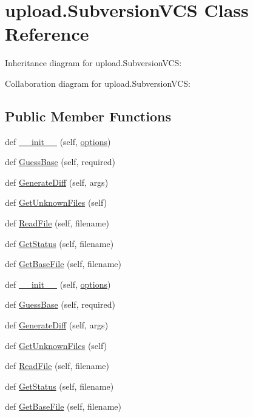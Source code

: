 \hypertarget{classupload_1_1_subversion_v_c_s}{}\section{upload.\+Subversion\+V\+CS Class Reference}
\label{classupload_1_1_subversion_v_c_s}


Inheritance diagram for upload.\+Subversion\+V\+CS\+:


Collaboration diagram for upload.\+Subversion\+V\+CS\+:
\subsection*{Public Member Functions}
\begin{DoxyCompactItemize}
\item 
def \hyperlink{classupload_1_1_subversion_v_c_s_a8333f94e27335ce83eed0cc3f5a1eeb0}{\+\_\+\+\_\+init\+\_\+\+\_\+} (self, \hyperlink{classupload_1_1_version_control_system_a4d57d043bc408887b94269fe4cea9556}{options})
\item 
def \hyperlink{classupload_1_1_subversion_v_c_s_a7d22d459469a757270502ce0dccacbd2}{Guess\+Base} (self, required)
\item 
def \hyperlink{classupload_1_1_subversion_v_c_s_a07c2d341f2c7df2772dd7f85e89b0212}{Generate\+Diff} (self, args)
\item 
def \hyperlink{classupload_1_1_subversion_v_c_s_a494ba1010992d83cac015bc396ab693a}{Get\+Unknown\+Files} (self)
\item 
def \hyperlink{classupload_1_1_subversion_v_c_s_a340d269b74386ac863636f6b0683d9f4}{Read\+File} (self, filename)
\item 
def \hyperlink{classupload_1_1_subversion_v_c_s_ac3785eb1fa561088206d01570f9fe982}{Get\+Status} (self, filename)
\item 
def \hyperlink{classupload_1_1_subversion_v_c_s_a29dec4941de0824734d6842a2f33ffc3}{Get\+Base\+File} (self, filename)
\item 
def \hyperlink{classupload_1_1_subversion_v_c_s_a8333f94e27335ce83eed0cc3f5a1eeb0}{\+\_\+\+\_\+init\+\_\+\+\_\+} (self, \hyperlink{classupload_1_1_version_control_system_a4d57d043bc408887b94269fe4cea9556}{options})
\item 
def \hyperlink{classupload_1_1_subversion_v_c_s_a7d22d459469a757270502ce0dccacbd2}{Guess\+Base} (self, required)
\item 
def \hyperlink{classupload_1_1_subversion_v_c_s_a07c2d341f2c7df2772dd7f85e89b0212}{Generate\+Diff} (self, args)
\item 
def \hyperlink{classupload_1_1_subversion_v_c_s_a494ba1010992d83cac015bc396ab693a}{Get\+Unknown\+Files} (self)
\item 
def \hyperlink{classupload_1_1_subversion_v_c_s_a340d269b74386ac863636f6b0683d9f4}{Read\+File} (self, filename)
\item 
def \hyperlink{classupload_1_1_subversion_v_c_s_ac3785eb1fa561088206d01570f9fe982}{Get\+Status} (self, filename)
\item 
def \hyperlink{classupload_1_1_subversion_v_c_s_a29dec4941de0824734d6842a2f33ffc3}{Get\+Base\+File} (self, filename)
\end{DoxyCompactItemize}
